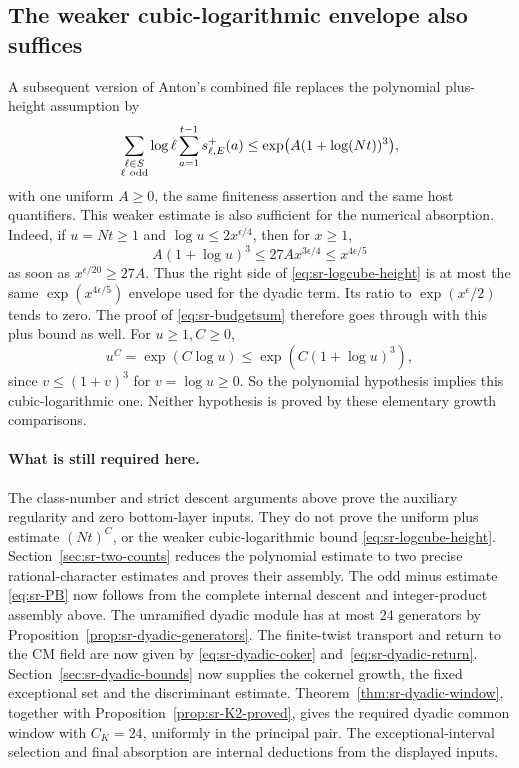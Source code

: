 \subsection{The weaker cubic-logarithmic envelope also suffices}
\label{sec:sr-logcube}
A subsequent version of Anton's combined file replaces the polynomial
plus-height assumption by
\begin{equation}\label{eq:sr-logcube-height}
 \sum_{\substack{\ell\in S\\\ell\ {\rm odd}}}\log\ell
           \sum_{a=1}^{t-1}s^+_{\ell,E}(a)
       \leq \exp\bigl(A(1+\log(Nt))^3\bigr),
\end{equation}
with one uniform \(A\geq0\), the same finiteness assertion and the same
host quantifiers.
This weaker estimate is also sufficient for the numerical absorption.
Indeed, if \(u=Nt\geq1\) and \(\log u\leq2x^{\epsilon/4}\), then for
\(x\geq1\),
\[
 A(1+\log u)^3\leq27A x^{3\epsilon/4}
                         \leq x^{4\epsilon/5}
\]
as soon as \(x^{\epsilon/20}\geq27A\).
Thus the right side of \eqref{eq:sr-logcube-height} is at most the
same \(\exp(x^{4\epsilon/5})\) envelope used for the dyadic term.
Its ratio to \(\exp(x^\epsilon/2)\) tends to zero.
The proof of \eqref{eq:sr-budgetsum} therefore goes through with
this plus bound as well.
For \(u\geq1,C\geq0\),
\[
 u^C=\exp(C\log u)\leq\exp(C(1+\log u)^3),
\]
since \(v\leq(1+v)^3\) for \(v=\log u\geq0\).
So the polynomial hypothesis implies this cubic-logarithmic one.
Neither hypothesis is proved by these elementary growth comparisons.

\paragraph{What is still required here.}
The class-number and strict descent arguments above prove the auxiliary
regularity and zero bottom-layer inputs.
They do not prove the uniform plus estimate \((Nt)^C\), or the weaker
cubic-logarithmic bound \eqref{eq:sr-logcube-height}.
Section~\ref{sec:sr-two-counts} reduces the polynomial estimate to two
precise rational-character estimates and proves their assembly.
The odd minus estimate \eqref{eq:sr-PB} now follows from the complete
internal descent and integer-product assembly above.
The unramified dyadic module has at most 24 generators by
Proposition~\ref{prop:sr-dyadic-generators}.
The finite-twist transport and return to the CM field are now given by
\eqref{eq:sr-dyadic-coker} and~\eqref{eq:sr-dyadic-return}.
Section~\ref{sec:sr-dyadic-bounds} now supplies the cokernel growth,
the fixed exceptional set and the discriminant estimate.
Theorem~\ref{thm:sr-dyadic-window}, together with
Proposition~\ref{prop:sr-K2-proved}, gives the required dyadic common
window with \(C_K=24\), uniformly in the principal pair.
The exceptional-interval selection and final absorption are internal
deductions from the displayed inputs.
